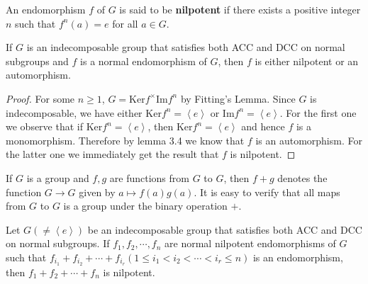 An endomorphism $f$ of $G$ is said to be \textbf{nilpotent} if there exists a positive integer $n$ such that $f^n(a)=e$ for all $a\in G$.
\begin{corollary}
If $G$ is an indecomposable group that satisfies both ACC and DCC on normal subgroups and $f$ is a normal endomorphism of $G$, then $f$ is either nilpotent or an automorphism.
\end{corollary}
\begin{proof}
For some $n\ge 1$, $G=\mathrm{Ker}f^\times\mathrm{Im}f^n$ by Fitting's Lemma. Since $G$ is indecomposable, we have either $\mathrm{Ker}f^n=\left<e\right>$ or $\mathrm{Im}f^n=\left<e\right>$. For the first one we observe that if $\mathrm{Ker}f^n=\left<e\right>$, then $\mathrm{Ker}f^n=\left<e\right>$ and hence $f$ is a monomorphism. Therefore by lemma 3.4 we know that $f$ is an automorphism. For the latter one we immediately get the result that $f$ is nilpotent.
\end{proof}
If $G$ is a group and $f,g$ are functions from $G$ to $G$, then $f+g$ denotes the function $G\to G$ given by $a\mapsto f(a)g(a)$. It is easy to verify that all maps from $G$ to $G$ is a group under the binary operation $+$.
\begin{corollary}
Let $G(\ne\left<e\right>)$ be an indecomposable group that satisfies both ACC and DCC on normal subgroups. If $f_1,f_2,\cdots,f_n$ are normal nilpotent endomorphisms of $G$ such that $f_{i_1}+f_{i_2}+\cdots+f_{i_r}(1\le i_1<i_2<\cdots<i_r\le n)$ is an endomorphism, then $f_1+f_2+\cdots+f_n$ is nilpotent.
\end{corollary}
